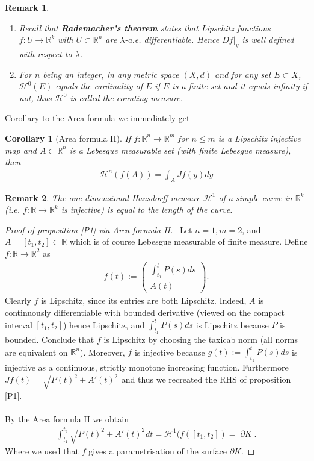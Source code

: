 \documentclass[12pt, a4paper, titlepage]{article}
\newtheorem{corollary}{Corollary}
\newtheorem{remark}{Remark}
\begin{document}
 \begin{remark} \ \begin{enumerate} 
\item Recall that \textbf{Rademacher's theorem} states that Lipschitz functions $f:U  \to \mathbb{R}^k$ with $U \subset \mathbb{R}^n$ are $\lambda$-a.e. differentiable. Hence $Df|_y$ is well defined with respect to $\lambda$. 
\item For $n$ being an integer, in any metric space $(X,d)$ and for any set $E \subset X$, $\mathcal{H}^0(E)$ equals the cardinality of $E$ if $E$ is a finite set and it equals infinity if not, thus $\mathcal{H}^0$ is called the counting measure. 
\end{enumerate} 
\end{remark}
Corollary to the Area formula we immediately get
\begin{corollary}[Area formula II]If $f: \mathbb{R}^n \to \mathbb{R}^m$ for $n \leq m$ is a Lipschitz injective map and $A \subset \mathbb{R}^n$ is a Lebesgue measurable set (with finite Lebesgue measure), then 
\begin{align*}
\mathcal{H}^n (f(A)) = \int_A Jf(y)dy
\end{align*}
\end{corollary} 
\begin{remark} The one-dimensional Hausdorff measure $\mathcal{H}^1$ of a simple curve in $\mathbb{R}^k$ (i.e. $f: \mathbb{R} \to \mathbb{R}^k$ is injective) is equal to the length of the curve. 
\end{remark}
\begin{proof}[Proof of proposition \ref{P1} via Area formula II] \ \newline  Let $n=1,m=2$, and $A= [t_1,t_2] \subset \mathbb{R}$ which is of course Lebesgue measurable of finite measure. Define $f: \mathbb{R} \to \mathbb{R}^2 $ as 
\begin{align*}
f(t):= \begin{pmatrix}
 \int_{t_1}^t P(s) ds \\ A(t)
\end{pmatrix}.
\end{align*}
Clearly $f$ is Lipschitz, since its entries are both Lipschitz. Indeed, $A$ is continuously differentiable with bounded derivative (viewed on the compact interval $[t_1,t_2]$) hence Lipschitz, and $\int_{t_1}^t P(s)ds$ is Lipschitz because $P$ is bounded. Conclude that $f$ is Lipschitz by choosing the taxicab norm (all norms are equivalent on $\mathbb{R}^n$). Moreover, $f$ is injective because $g(t):= \int_{t_1}^t P(s)ds$ is injective as a continuous, strictly monotone increasing function. Furthermore  $Jf(t)= \sqrt{ P(t)^2 + A'(t)^2}$ and thus we recreated the RHS of proposition \ref{P1}.
\\\\
By the Area formula II we obtain 
\begin{align*}
 \int_{t_1}^{t_2}  \sqrt{ P(t)^2 + A'(t)^2 } dt = \mathcal{H}^1 (f([t_1,t_2]) = | \partial K|.
\end{align*}
Where we used that $f$ gives a parametrisation of the surface $\partial K$. 
\end{proof}
\end{document}
